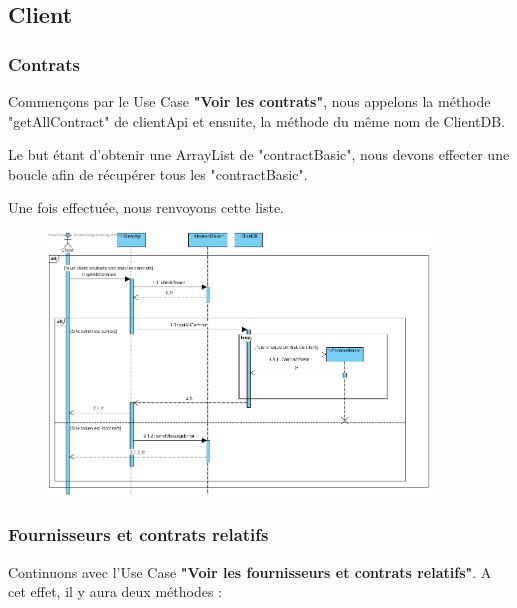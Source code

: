 \newpage
\subsection{Client}

\subsubsection{Contrats}\label{CONTRATS}

\begin{flushleft}
Commençons par le Use Case \textbf{"Voir les contrats"}, nous appelons la méthode "getAllContract" de clientApi et ensuite, la méthode du même nom de ClientDB.
\end{flushleft}

\begin{flushleft}
Le but étant d'obtenir une ArrayList de "contractBasic", nous devons effecter une boucle afin de récupérer tous les "contractBasic".
\end{flushleft}

\begin{flushleft}
Une fois effectuée, nous renvoyons cette liste.
\end{flushleft}

\begin{figure}[h]
\centering
\includegraphics[width = 0.9\textwidth]{Base/sequence/img/client/Voir les contrats.png}
\end{figure}

\newpage

\subsubsection{Fournisseurs et
contrats relatifs}
\begin{flushleft}
Continuons avec l'Use Case \textbf{"Voir les fournisseurs et
contrats relatifs"}.
A cet effet, il y aura deux méthodes :
\end{flushleft}

